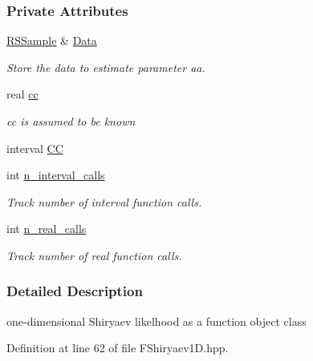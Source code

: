 \subsubsection*{\-Private \-Attributes}
\begin{DoxyCompactItemize}
\item 
\hyperlink{classRSSample}{\-R\-S\-Sample} \& \hyperlink{classFShiryaev1D__Lkl__aa__fromData_a63bdd5ba904fa6775561cdd28176b337}{\-Data}
\begin{DoxyCompactList}\small\item\em \-Store the data to estimate parameter aa. \end{DoxyCompactList}\item 
real \hyperlink{classFShiryaev1D__Lkl__aa__fromData_a1790f5e4dfc6d207371994c04e154c21}{cc}
\begin{DoxyCompactList}\small\item\em cc is assumed to be known \end{DoxyCompactList}\item 
interval \hyperlink{classFShiryaev1D__Lkl__aa__fromData_a306213ac1c465cf9d2bd6d1e502fcce2}{\-C\-C}
\item 
int \hyperlink{classFShiryaev1D__Lkl__aa__fromData_a7c759aeef9b7dbe5223ea3a564c60124}{n\-\_\-interval\-\_\-calls}
\begin{DoxyCompactList}\small\item\em \-Track number of interval function calls. \end{DoxyCompactList}\item 
int \hyperlink{classFShiryaev1D__Lkl__aa__fromData_a1a371cc6b90e1b0a1975d1ddbcdac4eb}{n\-\_\-real\-\_\-calls}
\begin{DoxyCompactList}\small\item\em \-Track number of real function calls. \end{DoxyCompactList}\end{DoxyCompactItemize}


\subsubsection{\-Detailed \-Description}
one-\/dimensional \-Shiryaev likelhood as a function object class 

\-Definition at line 62 of file \-F\-Shiryaev1\-D.\-hpp.



